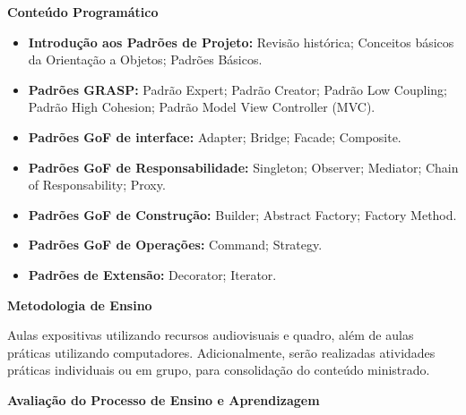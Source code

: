 
\begin{snugshade}\begin{center}\textbf{
    Conteúdo Programático
}\end{center}\end{snugshade}

\begin{itemize}

 \item \textbf{Introdução aos Padrões de Projeto:} Revisão histórica; Conceitos básicos da Orientação a Objetos; Padrões Básicos.

 \item \textbf{Padrões GRASP: } Padrão Expert; Padrão Creator; Padrão Low Coupling; Padrão High Cohesion; Padrão Model View Controller (MVC).

 \item \textbf{Padrões GoF de interface:}  Adapter; Bridge; Facade; Composite.

 \item \textbf{Padrões GoF de Responsabilidade:} Singleton; Observer; Mediator; Chain of Responsability; Proxy.

 \item \textbf{Padrões GoF de Construção:} Builder; Abstract Factory; Factory Method.

 \item \textbf{Padrões GoF de Operações:} Command; Strategy.

 \item \textbf{Padrões de Extensão:} Decorator; Iterator.

\end{itemize}

\begin{snugshade}\begin{center}\textbf{
    Metodologia de Ensino
}\end{center}\end{snugshade} 

\noindent
   Aulas expositivas utilizando recursos audiovisuais e quadro, além de aulas práticas utilizando computadores. Adicionalmente, serão realizadas atividades práticas individuais ou em grupo, para consolidação do conteúdo ministrado.

\begin{snugshade}\begin{center}\textbf{
    Avaliação do Processo de Ensino e Aprendizagem
}\end{center}\end{snugshade}   

